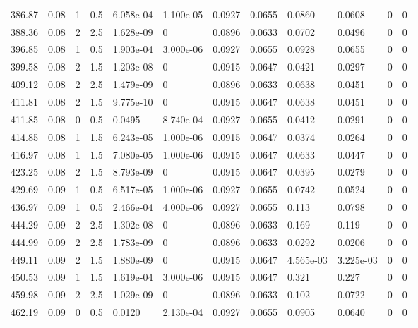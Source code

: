 \documentclass[preview]{standalone}
\begin{document}
{{{\begin{tabular}{L{1.2cm}C{1.2cm} C{0.3cm}C{0.5cm} C{1.4cm}C{1.4cm} C{1.4cm}C{1.4cm} C{1.6cm}C{1.6cm} C{1.6cm}C{1.6cm}}
  386.87  &  0.08  & 1     & 0.5 &  6.058e-04  & 1.100e-05  &  0.0927&   0.0655& 0.0860 & 0.0608   &  0 & 0  \\ 
  388.36  &  0.08  & 2     & 2.5 &  1.628e-09  & 0  &  0.0896&   0.0633& 0.0702 & 0.0496   &  0 & 0  \\ 
  396.85  &  0.08  & 1     & 0.5 &  1.903e-04  & 3.000e-06  &  0.0927&   0.0655& 0.0928 & 0.0655   &  0 & 0  \\ 
  399.58  &  0.08  & 2     & 1.5 &  1.203e-08  & 0  &  0.0915&   0.0647& 0.0421 & 0.0297   &  0 & 0  \\ 
  409.12  &  0.08  & 2     & 2.5 &  1.479e-09  & 0  &  0.0896&   0.0633& 0.0638 & 0.0451   &  0 & 0  \\ 
  411.81  &  0.08  & 2     & 1.5 &  9.775e-10  & 0  &  0.0915&   0.0647& 0.0638 & 0.0451   &  0 & 0  \\ 
  411.85  &  0.08  & 0     & 0.5 &  0.0495  & 8.740e-04  &  0.0927&   0.0655& 0.0412 & 0.0291   &  0 & 0  \\ 
  414.85  &  0.08  & 1     & 1.5 &  6.243e-05  & 1.000e-06  &  0.0915&   0.0647& 0.0374 & 0.0264   &  0 & 0  \\ 
  416.97  &  0.08  & 1     & 1.5 &  7.080e-05  & 1.000e-06  &  0.0915&   0.0647& 0.0633 & 0.0447   &  0 & 0  \\ 
  423.25  &  0.08  & 2     & 1.5 &  8.793e-09  & 0  &  0.0915&   0.0647& 0.0395 & 0.0279   &  0 & 0  \\ 
  429.69  &  0.09  & 1     & 0.5 &  6.517e-05  & 1.000e-06  &  0.0927&   0.0655& 0.0742 & 0.0524   &  0 & 0  \\ 
  436.97  &  0.09  & 1     & 0.5 &  2.466e-04  & 4.000e-06  &  0.0927&   0.0655& 0.113 & 0.0798   &  0 & 0  \\ 
  444.29  &  0.09  & 2     & 2.5 &  1.302e-08  & 0  &  0.0896&   0.0633& 0.169 & 0.119   &  0 & 0  \\ 
  444.99  &  0.09  & 2     & 2.5 &  1.783e-09  & 0  &  0.0896&   0.0633& 0.0292 & 0.0206   &  0 & 0  \\ 
  449.11  &  0.09  & 2     & 1.5 &  1.880e-09  & 0  &  0.0915&   0.0647& 4.565e-03 & 3.225e-03   &  0 & 0  \\ 
  450.53  &  0.09  & 1     & 1.5 &  1.619e-04  & 3.000e-06  &  0.0915&   0.0647& 0.321 & 0.227   &  0 & 0  \\ 
  459.98  &  0.09  & 2     & 2.5 &  1.029e-09  & 0  &  0.0896&   0.0633& 0.102 & 0.0722   &  0 & 0  \\ 
  462.19  &  0.09  & 0     & 0.5 &  0.0120  & 2.130e-04  &  0.0927&   0.0655& 0.0905 & 0.0640   &  0 & 0  \\ 

\end{tabular}}}}
\end{document}

